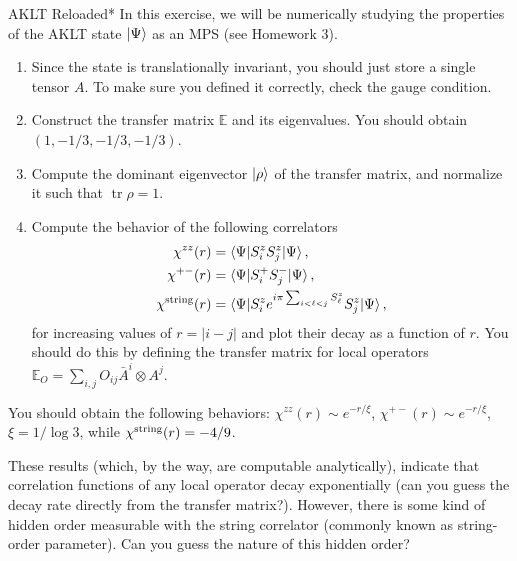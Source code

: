 \documentclass[a4paper,10pt,twoside]{article}
\DeclareMathOperator{\trace}{tr}
\begin{document}
\begin{section}{AKLT Reloaded*}
In this exercise, we will be numerically studying the properties of the AKLT state $\ket{\Psi}$ as an MPS (see Homework 3).

\begin{enumerate}[label=(\alph*)]
  \item Since the state is translationally invariant, you should just store a single tensor $A$. To make sure you defined it correctly, check the gauge condition.
  \item Construct the transfer matrix $\mathbb{E}$ and its eigenvalues. You should obtain $(1,-1/3,-1/3,-1/3)$.
  \item Compute the dominant eigenvector $\ket{\rho}$ of the transfer matrix, and normalize it such that $\trace{\rho} = 1$.
  \item Compute the behavior of the following correlators
  \begin{align*}
    \chi^{zz}(r) &= \braket{\Psi | S^z_i S^z_j | \Psi} ,\\
    \chi^{+-}(r) &= \braket{\Psi | S^+_i S^-_j | \Psi} ,\\ 
    \chi^{\rm string}(r) &= \braket{\Psi | S^z_i e^{i \pi \sum_{i<\ell<j} S^z_\ell} S^z_j | \Psi} ,
  \end{align*}
  for increasing values of $r=|i-j|$ and plot their decay as a function of $r$. 
  You should do this by defining the transfer matrix for local operators $\mathbb{E}_O = \sum_{i,j} O_{ij}  \bar{A}^{i} \otimes A^{j}$.
\end{enumerate}
You should obtain the following behaviors: $\chi^{zz}(r) \sim e^{-r/\xi}$, $\chi^{+-}(r) \sim e^{-r/\xi}$, $\xi = 1/\log 3$, while $\chi^{\rm string}(r) = -4/9$.

These results (which, by the way, are computable analytically), indicate that correlation functions of any local operator decay exponentially (can you guess the decay rate directly from the transfer matrix?). 
However, there is some kind of hidden order measurable with the string correlator (commonly known as string-order parameter). 
Can you guess the nature of this hidden order?

\end{section}
\end{document}
